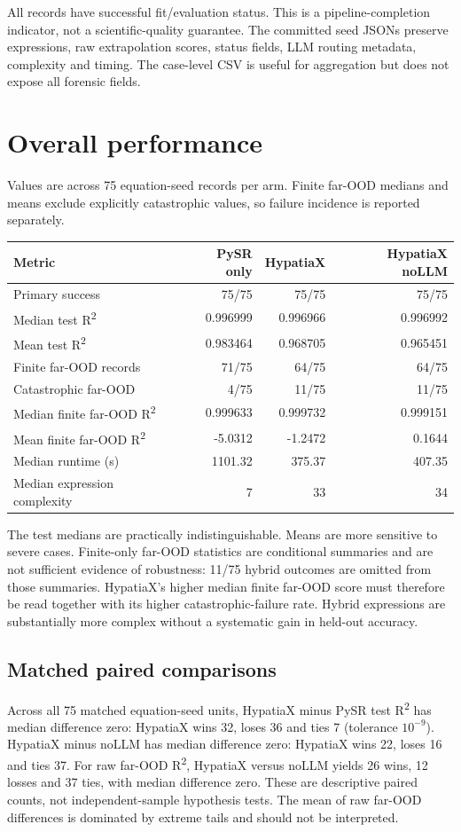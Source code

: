 \documentclass[11pt,a4paper]{article}
\begin{document}
All records have successful fit/evaluation status. This is a pipeline-completion indicator, not a scientific-quality guarantee. The committed seed JSONs preserve expressions, raw extrapolation scores, status fields, LLM routing metadata, complexity and timing. The case-level CSV is useful for aggregation but does not expose all forensic fields.

\section{Overall performance}
Values are across 75 equation-seed records per arm. Finite far-OOD medians and means exclude explicitly catastrophic values, so failure incidence is reported separately.

\begin{center}
\small
\begin{tabular}{lrrr}
\toprule
Metric & PySR only & HypatiaX & HypatiaX noLLM\\
\midrule
Primary success & 75/75 & 75/75 & 75/75\\
Median test R\textsuperscript{2} & 0.996999 & 0.996966 & 0.996992\\
Mean test R\textsuperscript{2} & 0.983464 & 0.968705 & 0.965451\\
Finite far-OOD records & 71/75 & 64/75 & 64/75\\
Catastrophic far-OOD & 4/75 & 11/75 & 11/75\\
Median finite far-OOD R\textsuperscript{2} & 0.999633 & 0.999732 & 0.999151\\
Mean finite far-OOD R\textsuperscript{2} & -5.0312 & -1.2472 & 0.1644\\
Median runtime (s) & 1101.32 & 375.37 & 407.35\\
Median expression complexity & 7 & 33 & 34\\
\bottomrule
\end{tabular}
\end{center}

The test medians are practically indistinguishable. Means are more sensitive to severe cases. Finite-only far-OOD statistics are conditional summaries and are not sufficient evidence of robustness: 11/75 hybrid outcomes are omitted from those summaries. HypatiaX's higher median finite far-OOD score must therefore be read together with its higher catastrophic-failure rate. Hybrid expressions are substantially more complex without a systematic gain in held-out accuracy.

\subsection{Matched paired comparisons}
Across all 75 matched equation-seed units, HypatiaX minus PySR test R\textsuperscript{2} has median difference zero: HypatiaX wins 32, loses 36 and ties 7 (tolerance $10^{-9}$). HypatiaX minus noLLM has median difference zero: HypatiaX wins 22, loses 16 and ties 37. For raw far-OOD R\textsuperscript{2}, HypatiaX versus noLLM yields 26 wins, 12 losses and 37 ties, with median difference zero. These are descriptive paired counts, not independent-sample hypothesis tests. The mean of raw far-OOD differences is dominated by extreme tails and should not be interpreted.
\end{document}
